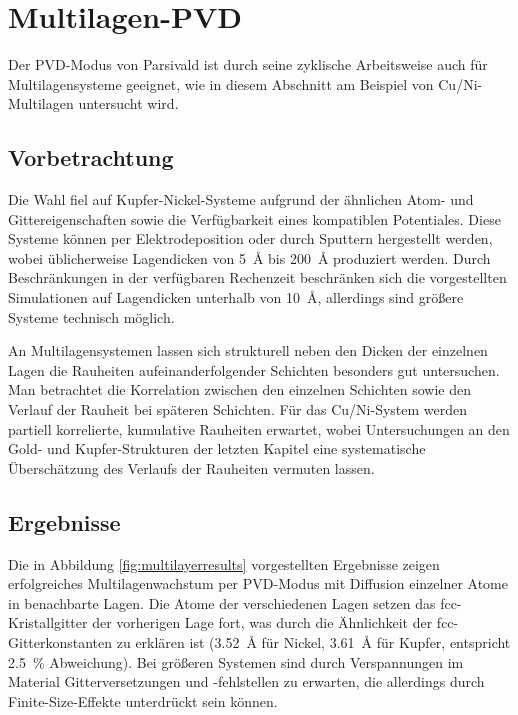 \section{Multilagen-PVD}
\label{multilayer}

Der PVD-Modus von Parsivald ist durch seine zyklische Arbeitsweise auch für Multilagensysteme geeignet, wie in diesem Abschnitt am Beispiel von Cu/Ni-Multilagen untersucht wird.

\subsection{Vorbetrachtung}
Die Wahl fiel auf Kupfer-Nickel-Systeme aufgrund der ähnlichen Atom- und Gittereigenschaften sowie die Verfügbarkeit eines kompatiblen Potentiales.
Diese Systeme können per Elektro\-deposition oder durch Sputtern hergestellt werden, wobei üblicherweise Lagendicken von \SI{5}{\angstrom} bis \SI{200}{\angstrom} produziert werden.
Durch Beschränkungen in der verfügbaren Rechenzeit beschränken sich die vorgestellten Simulationen auf Lagendicken unterhalb von \SI{10}{\angstrom}, allerdings sind größere Systeme technisch möglich.

An Multilagensystemen lassen sich strukturell neben den Dicken der einzelnen Lagen die Rauheiten aufeinanderfolgender Schichten besonders gut untersuchen.
Man betrachtet die Korrelation zwischen den einzelnen Schichten sowie den Verlauf der Rauheit bei späteren Schichten.
Für das Cu/Ni-System werden partiell korrelierte, kumulative Rauheiten erwartet, wobei Untersuchungen an den Gold- und Kupfer-Strukturen der letzten Kapitel eine systematische Überschätzung des Verlaufs der Rauheiten vermuten lassen.

\subsection{Ergebnisse}

Die in Abbildung \ref{fig:multilayerresults} vorgestellten Ergebnisse zeigen erfolgreiches Multilagenwachstum per PVD-Modus mit Diffusion einzelner Atome in benachbarte Lagen.
Die Atome der verschiedenen Lagen setzen das fcc-Kristallgitter der vorherigen Lage fort, was durch die Ähnlichkeit der fcc-Gitterkonstanten zu erklären ist (\SI{3.52}{\angstrom} für Nickel, \SI{3.61}{\angstrom} für Kupfer, entspricht \SI{2.5}{\percent} Abweichung).
Bei größeren Systemen sind durch Verspannungen im Material Gitterversetzungen und -fehlstellen zu erwarten, die allerdings durch Finite-Size-Effekte unterdrückt sein können.

